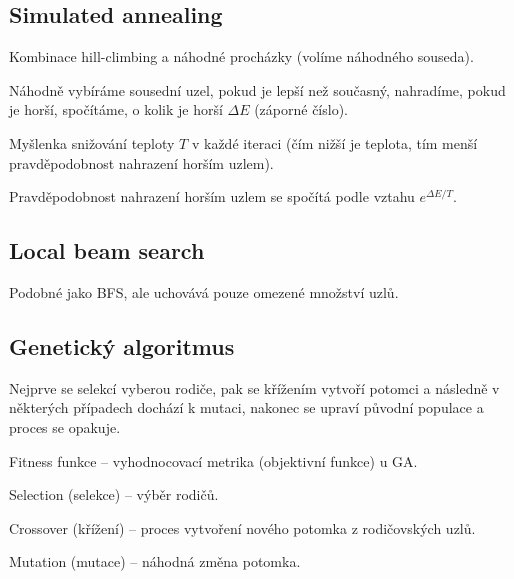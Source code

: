 \subsection{Simulated annealing}

\begin{compactitem}
    \item Kombinace hill-climbing a náhodné procházky (volíme náhodného souseda).
    \item Náhodně vybíráme sousední uzel, pokud je lepší než současný, nahradíme, pokud je horší, spočítáme, o kolik je horší $\Delta E$ (záporné číslo).
    \item Myšlenka snižování teploty $T$ v každé iteraci (čím nižší je teplota, tím menší pravděpodobnost nahrazení horším uzlem).
    \item Pravděpodobnost nahrazení horším uzlem se spočítá podle vztahu $e^{\Delta E / T}$.
\end{compactitem}

\subsection{Local beam search}

\begin{compactitem}
    \item Podobné jako BFS, ale uchovává pouze omezené množství uzlů.
\end{compactitem}

\subsection{Genetický algoritmus}

\begin{compactitem}
    \item Nejprve se selekcí vyberou rodiče, pak se křížením vytvoří potomci a následně v některých případech dochází k mutaci, nakonec se upraví původní populace a proces se opakuje. \begin{compactitem}
        \item Fitness funkce -- vyhodnocovací metrika (objektivní funkce) u GA.
        \item Selection (selekce) -- výběr rodičů.
        \item Crossover (křížení) -- proces vytvoření nového potomka z rodičovských uzlů.
        \item Mutation (mutace) -- náhodná změna potomka.
    \end{compactitem}
\end{compactitem}

